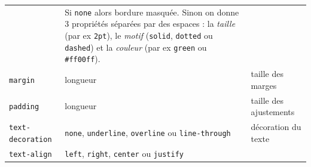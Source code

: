 \documentclass[a4paper,17pt]{extarticle}
\begin{document}
\begin{exemple}
\begin{longtable}[]{@{}lll@{}}
\begin{minipage}[t]{0.23\columnwidth}
\end{minipage} & \begin{minipage}[t]{0.37\columnwidth}\raggedright
Si \texttt{none} alors bordure masquée. Sinon on donne 3 propriétés
séparées par des espaces : la \emph{taille} (par ex \texttt{2pt}), le
\emph{motif} (\texttt{solid}, \texttt{dotted} ou \texttt{dashed}) et la
\emph{couleur} (par ex \texttt{green} ou \texttt{\#ff00ff}).\strut
\end{minipage}\tabularnewline
\begin{minipage}[t]{0.31\columnwidth}\raggedright
\texttt{margin}\strut
\end{minipage} & \begin{minipage}[t]{0.23\columnwidth}\raggedright
longueur\strut
\end{minipage} & \begin{minipage}[t]{0.37\columnwidth}\raggedright
taille des marges\strut
\end{minipage}\tabularnewline
\begin{minipage}[t]{0.31\columnwidth}\raggedright
\texttt{padding}\strut
\end{minipage} & \begin{minipage}[t]{0.23\columnwidth}\raggedright
longueur\strut
\end{minipage} & \begin{minipage}[t]{0.37\columnwidth}\raggedright
taille des ajustements\strut
\end{minipage}\tabularnewline
\begin{minipage}[t]{0.31\columnwidth}\raggedright
\texttt{text-decoration}\strut
\end{minipage} & \begin{minipage}[t]{0.23\columnwidth}\raggedright
\texttt{none}, \texttt{underline}, \texttt{overline} ou
\texttt{line-through}\strut
\end{minipage} & \begin{minipage}[t]{0.37\columnwidth}\raggedright
décoration du texte\strut
\end{minipage}\tabularnewline
\begin{minipage}[t]{0.31\columnwidth}\raggedright
\texttt{text-align}\strut
\end{minipage} & \begin{minipage}[t]{0.23\columnwidth}\raggedright
\texttt{left}, \texttt{right}, \texttt{center} ou \texttt{justify}\strut
\end{minipage} & \begin{minipage}[t]{0.37\columnwidth}\raggedright

\end{minipage}
\end{longtable}
\end{exemple}
\end{document}
